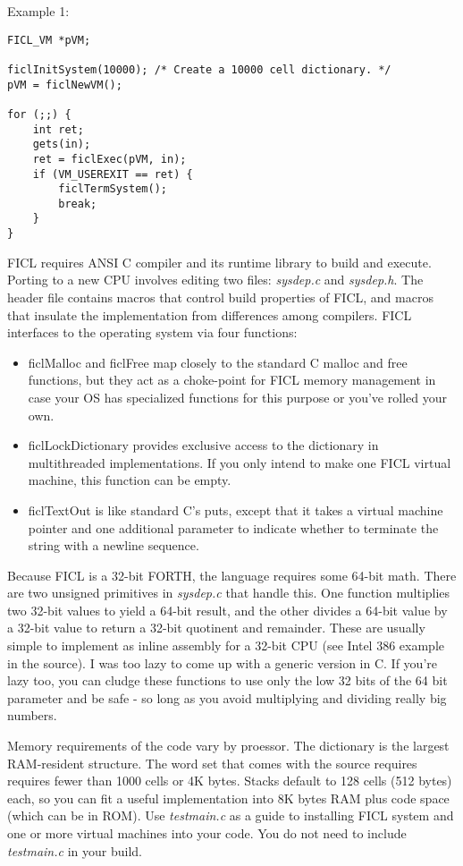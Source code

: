 Example 1:
\begin{lstlisting}[frame=single]
FICL_VM *pVM;

ficlInitSystem(10000); /* Create a 10000 cell dictionary. */
pVM = ficlNewVM();

for (;;) {
	int ret;
	gets(in);
	ret = ficlExec(pVM, in);
	if (VM_USEREXIT == ret) {
		ficlTermSystem();
		break;
	}
}
\end{lstlisting}
FICL requires ANSI C compiler and its runtime library to build and
execute. Porting to a new CPU involves editing two files:
\textit{sysdep.c} and \textit{sysdep.h}. The header file contains macros
that control build properties of FICL, and macros that insulate the
implementation from differences among compilers. FICL interfaces to the
operating system via four functions:
\begin{itemize}[noitemsep]
	\item ficlMalloc and ficlFree map closely to the standard C
	malloc and free functions, but they act as a choke-point for
	FICL memory management in case your OS has specialized functions
	for this purpose or you've rolled your own.

	\item ficlLockDictionary provides exclusive access to the
	dictionary in multithreaded implementations. If you only intend
	to make one FICL virtual machine, this function can be empty.

	\item ficlTextOut is like standard C's puts, except that it
	takes a virtual machine pointer and one additional parameter to
	indicate whether to terminate the string with a newline sequence.
\end{itemize}
Because FICL is a 32-bit FORTH, the language requires some 64-bit math.
There are two unsigned primitives in \textit{sysdep.c} that handle this.
One function multiplies two 32-bit values to yield a 64-bit result, and
the other divides a 64-bit value by a 32-bit value to return a 32-bit
quotinent and remainder. These are usually simple to implement as inline
assembly for a 32-bit CPU (see Intel 386 example in the source). I was
too lazy to come up with a generic version in C. If you're lazy too, you
can cludge these functions to use only the low 32 bits of the 64 bit
parameter and be safe - so long as you avoid multiplying and dividing
really big numbers.

Memory requirements of the code vary by proessor. The dictionary is the
largest RAM-resident structure. The word set that comes with the source
requires requires fewer than 1000 cells or 4K bytes. Stacks default to
128 cells (512 bytes) each, so you can fit a useful implementation into
8K bytes RAM plus code space (which can be in ROM). Use
\textit{testmain.c} as a guide to installing FICL system and one or more
virtual machines into your code. You do not need to include
\textit{testmain.c} in your build.


